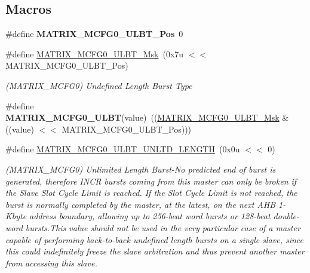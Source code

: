 \subsection*{Macros}
\begin{DoxyCompactItemize}
\item 
\mbox{\label{group__SAMS70__MATRIX_gacdf8355a07696be09be884af4528a965}} 
\#define {\bfseries M\+A\+T\+R\+I\+X\+\_\+\+M\+C\+F\+G0\+\_\+\+U\+L\+B\+T\+\_\+\+Pos}~0
\item 
\mbox{\label{group__SAMS70__MATRIX_ga0387cd5fd352f9c60e44a20f6b359665}} 
\#define \mbox{\hyperlink{group__SAMS70__MATRIX_ga0387cd5fd352f9c60e44a20f6b359665}{M\+A\+T\+R\+I\+X\+\_\+\+M\+C\+F\+G0\+\_\+\+U\+L\+B\+T\+\_\+\+Msk}}~(0x7u $<$$<$ M\+A\+T\+R\+I\+X\+\_\+\+M\+C\+F\+G0\+\_\+\+U\+L\+B\+T\+\_\+\+Pos)
\begin{DoxyCompactList}\small\item\em (M\+A\+T\+R\+I\+X\+\_\+\+M\+C\+F\+G0) Undefined Length Burst Type \end{DoxyCompactList}\item 
\mbox{\label{group__SAMS70__MATRIX_ga78a940ff2998526ba301620f186708ca}} 
\#define {\bfseries M\+A\+T\+R\+I\+X\+\_\+\+M\+C\+F\+G0\+\_\+\+U\+L\+BT}(value)~((\mbox{\hyperlink{group__SAMS70__MATRIX_ga0387cd5fd352f9c60e44a20f6b359665}{M\+A\+T\+R\+I\+X\+\_\+\+M\+C\+F\+G0\+\_\+\+U\+L\+B\+T\+\_\+\+Msk}} \& ((value) $<$$<$ M\+A\+T\+R\+I\+X\+\_\+\+M\+C\+F\+G0\+\_\+\+U\+L\+B\+T\+\_\+\+Pos)))
\item 
\mbox{\label{group__SAMS70__MATRIX_ga31c3afc145f0373f9a8d6360114512c0}} 
\#define \mbox{\hyperlink{group__SAMS70__MATRIX_ga31c3afc145f0373f9a8d6360114512c0}{M\+A\+T\+R\+I\+X\+\_\+\+M\+C\+F\+G0\+\_\+\+U\+L\+B\+T\+\_\+\+U\+N\+L\+T\+D\+\_\+\+L\+E\+N\+G\+TH}}~(0x0u $<$$<$ 0)
\begin{DoxyCompactList}\small\item\em (M\+A\+T\+R\+I\+X\+\_\+\+M\+C\+F\+G0) Unlimited Length Burst-\/\+No predicted end of burst is generated, therefore I\+N\+CR bursts coming from this master can only be broken if the Slave Slot Cycle Limit is reached. If the Slot Cycle Limit is not reached, the burst is normally completed by the master, at the latest, on the next A\+HB 1-\/Kbyte address boundary, allowing up to 256-\/beat word bursts or 128-\/beat double-\/word bursts.\+This value should not be used in the very particular case of a master capable of performing back-\/to-\/back undefined length bursts on a single slave, since this could indefinitely freeze the slave arbitration and thus prevent another master from accessing this slave. \end{DoxyCompactList}\item 
$$
\end{DoxyCompactItemize}

